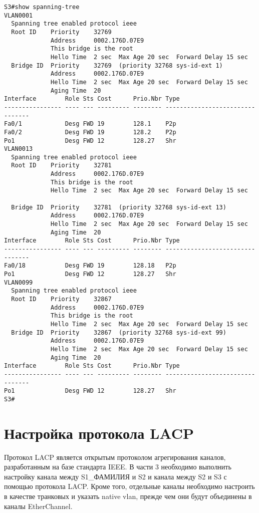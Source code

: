 \begin{verbatim}
S3#show spanning-tree 
VLAN0001
  Spanning tree enabled protocol ieee
  Root ID    Priority    32769
             Address     0002.176D.07E9
             This bridge is the root
             Hello Time  2 sec  Max Age 20 sec  Forward Delay 15 sec
  Bridge ID  Priority    32769  (priority 32768 sys-id-ext 1)
             Address     0002.176D.07E9
             Hello Time  2 sec  Max Age 20 sec  Forward Delay 15 sec
             Aging Time  20
Interface        Role Sts Cost      Prio.Nbr Type
---------------- ---- --- --------- -------- --------------------------------
Fa0/1            Desg FWD 19        128.1    P2p
Fa0/2            Desg FWD 19        128.2    P2p
Po1              Desg FWD 12        128.27   Shr
VLAN0013
  Spanning tree enabled protocol ieee
  Root ID    Priority    32781
             Address     0002.176D.07E9
             This bridge is the root
             Hello Time  2 sec  Max Age 20 sec  Forward Delay 15 sec

  Bridge ID  Priority    32781  (priority 32768 sys-id-ext 13)
             Address     0002.176D.07E9
             Hello Time  2 sec  Max Age 20 sec  Forward Delay 15 sec
             Aging Time  20
Interface        Role Sts Cost      Prio.Nbr Type
---------------- ---- --- --------- -------- --------------------------------
Fa0/18           Desg FWD 19        128.18   P2p
Po1              Desg FWD 12        128.27   Shr
VLAN0099
  Spanning tree enabled protocol ieee
  Root ID    Priority    32867
             Address     0002.176D.07E9
             This bridge is the root
             Hello Time  2 sec  Max Age 20 sec  Forward Delay 15 sec
  Bridge ID  Priority    32867  (priority 32768 sys-id-ext 99)
             Address     0002.176D.07E9
             Hello Time  2 sec  Max Age 20 sec  Forward Delay 15 sec
             Aging Time  20
Interface        Role Sts Cost      Prio.Nbr Type
---------------- ---- --- --------- -------- --------------------------------
Po1              Desg FWD 12        128.27   Shr
S3#
\end{verbatim}

\section{Настройка протокола LACP}

Протокол LACP является открытым протоколом агрегирования каналов,
разработанным на базе стандарта IEEE.
В части 3 необходимо выполнить настройку канала между S1\_ФАМИЛИЯ и S2
и канала между S2 и S3 с помощью протокола LACP.
Кроме того, отдельные каналы необходимо настроить в качестве транковых
и указать native vlan, прежде чем они будут объединены в каналы EtherChannel.

